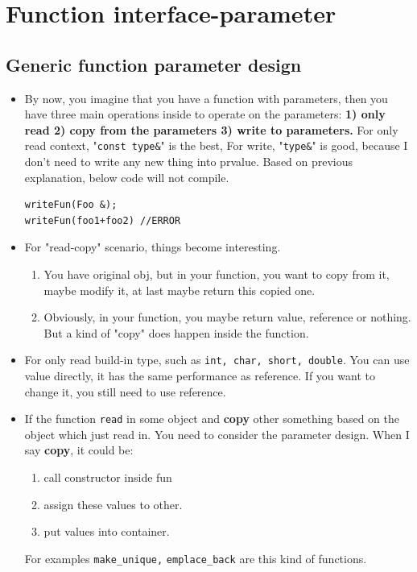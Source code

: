 \documentclass[a4paper,11pt,twoside]{book}
\begin{document}
\section{Function interface-parameter}

\subsection{Generic function parameter design}

\begin{itemize}

\item  By now, you imagine that you have a function with parameters, then you have three main operations inside to operate on the parameters: \textbf{1) only read 2) copy from the parameters 3) write to parameters.} For only read context, "\texttt{const type\&}" is the best, For write, "\texttt{type\&}" is good, because I don't need to write any new thing into prvalue. Based on previous explanation, below code will not compile. 
\begin{lstlisting}[numbers=none]
writeFun(Foo &);
writeFun(foo1+foo2) //ERROR
\end{lstlisting}

\item For "read-copy" scenario, things become interesting.
\begin{enumerate}
	\item You have original obj, but in your function, you want to copy from it, maybe modify it, at last maybe return this copied one.

	\item Obviously, in your function, you maybe return value, reference or nothing. But a kind of "copy" does happen inside the function.
\end{enumerate}

    \item For only read build-in type, such as \texttt{int, char, short, double}. You can use value directly, it has the same performance as reference. If you want to change it, you still need to use reference.

    \item If the function \texttt{read} in some object and \textbf{copy} other something based on the object which just read in. You need to consider the parameter design. When I say \textbf{copy}, it could be:
\begin{enumerate}
	\item call constructor inside fun
	\item assign these values to other.
	\item put values into container.
\end{enumerate} 
For examples \texttt{make\_unique,} \texttt{emplace\_back} are this kind of functions.
\end{itemize}
\end{document}
